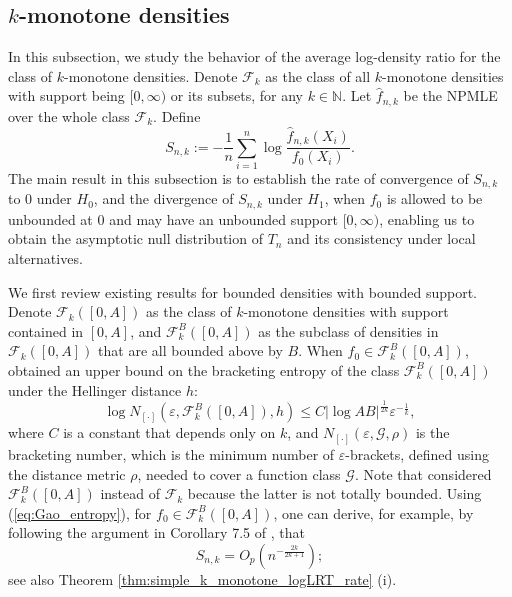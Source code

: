 \documentclass[12pt,letterpaper, twoside, openany]{article}
\theoremstyle{plain}
\begin{document}
	
\subsection{$k$-monotone densities}\label{subsect:k_log_density_ratio}
In this subsection, we study the behavior of the average log-density ratio for the class of $k$-monotone densities. Denote $\mathcal{F}_k$ as the class of all $k$-monotone densities with support being $[0,\infty)$ or its subsets, for any $k\in \mathbb{N}$. Let $\hat{f}_{n,k}$ be the NPMLE over the whole class $\mathcal{F}_k$.
Define
\begin{equation}\label{eq:def_Kn}
S_{n,k} := - \frac{1}{n} \sum^n_{i=1} \log \frac{\hat{f}_{n,k}(X_i)}{f_0(X_i)}.
\end{equation}
The main result in this subsection is to establish the rate of convergence of $S_{n,k}$ to $0$ under $H_0$, and the divergence of $S_{n,k}$ under $H_1$, when $f_0$ is allowed to be unbounded at $0$ and may have an unbounded support $[0,\infty)$, enabling us to obtain the asymptotic null distribution of $T_n$ and its consistency under local alternatives. 

  
We first review existing results for bounded densities with bounded support. 
 Denote $\mathcal{F}_k([0, A])$ as the class of $k$-monotone densities with support contained in $[0, A]$, and $\mathcal{F}^B_k([0, A])$ as the subclass of densities in $\mathcal{F}_k([0,A])$ that are all bounded above by $B$.
When $f_0 \in \mathcal{F}^B_k([0,A])$, 
\cite{gao2009rate} obtained an upper bound on the bracketing entropy of the class $\mathcal{F}^B_k([0, A])$ under the Hellinger distance $h$:
\begin{equation}\label{eq:Gao_entropy}
    \log N_{[\cdot]}(\varepsilon, \mathcal{F}^B_k([0, A]), h) \leq C |\log A B |^{\frac{1}{2k}} \varepsilon^{-\frac{1}{k}},
\end{equation}
where $C$ is a constant that depends only on $k$, and $N_{[\cdot]}(\varepsilon, \mathcal{G}, \rho)$ is the bracketing number, which is the minimum number of $\varepsilon$-brackets, defined using the distance metric $\rho$, needed to cover a function class $\mathcal{G}$. Note that \cite{gao2009rate} considered $\mathcal{F}_k^B([0,A])$ instead of $\mathcal{F}_k$ because the latter is not totally bounded.
Using (\ref{eq:Gao_entropy}), for $f_0 \in \mathcal{F}^B_k([0, A])$, 
one can derive, for example, by following the argument in Corollary 7.5 of \cite{van2000empirical}, that
\begin{equation}\label{eq:K_n_order_existing_way}
    S_{n,k} = O_p\left(n^{-\frac{2k}{2k+1}}\right);
\end{equation}
see also Theorem \ref{thm:simple_k_monotone_logLRT_rate} (i).
	
\end{document}
